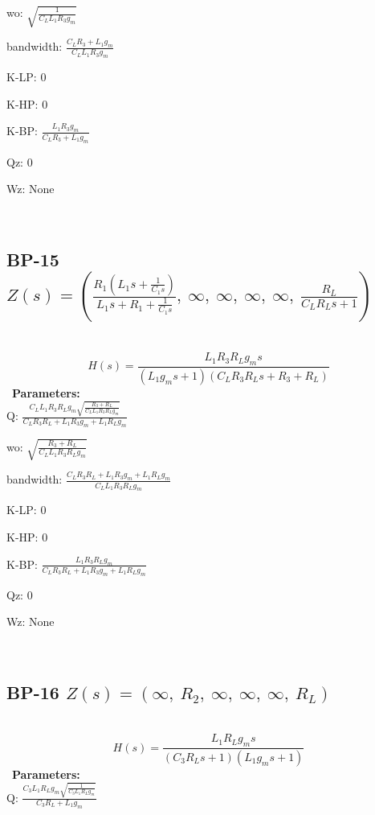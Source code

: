 \documentclass{article}
\begin{document}
wo: $\sqrt{\frac{1}{C_{L} L_{1} R_{3} g_{m}}}$\ 

bandwidth: $\frac{C_{L} R_{3} + L_{1} g_{m}}{C_{L} L_{1} R_{3} g_{m}}$\ 

K-LP: $0$\ 

K-HP: $0$\ 

K-BP: $\frac{L_{1} R_{3} g_{m}}{C_{L} R_{3} + L_{1} g_{m}}$\ 

Qz: $0$\ 

Wz: $\text{None}$\ 

\ 

\subsection{BP-15 $Z(s) = \left( \frac{R_{1} \left(L_{1} s + \frac{1}{C_{1} s}\right)}{L_{1} s + R_{1} + \frac{1}{C_{1} s}}, \  \infty, \  \infty, \  \infty, \  \infty, \  \frac{R_{L}}{C_{L} R_{L} s + 1}\right)$ } \ 
\textbf{\[H(s) = \frac{L_{1} R_{3} R_{L} g_{m} s}{\left(L_{1} g_{m} s + 1\right) \left(C_{L} R_{3} R_{L} s + R_{3} + R_{L}\right)}\] } \ 
\textbf{Parameters:}\\ 

Q: $\frac{C_{L} L_{1} R_{3} R_{L} g_{m} \sqrt{\frac{R_{3} + R_{L}}{C_{L} L_{1} R_{3} R_{L} g_{m}}}}{C_{L} R_{3} R_{L} + L_{1} R_{3} g_{m} + L_{1} R_{L} g_{m}}$\ 

wo: $\sqrt{\frac{R_{3} + R_{L}}{C_{L} L_{1} R_{3} R_{L} g_{m}}}$\ 

bandwidth: $\frac{C_{L} R_{3} R_{L} + L_{1} R_{3} g_{m} + L_{1} R_{L} g_{m}}{C_{L} L_{1} R_{3} R_{L} g_{m}}$\ 

K-LP: $0$\ 

K-HP: $0$\ 

K-BP: $\frac{L_{1} R_{3} R_{L} g_{m}}{C_{L} R_{3} R_{L} + L_{1} R_{3} g_{m} + L_{1} R_{L} g_{m}}$\ 

Qz: $0$\ 

Wz: $\text{None}$\ 

\ 

\subsection{BP-16 $Z(s) = \left( \infty, \  R_{2}, \  \infty, \  \infty, \  \infty, \  R_{L}\right)$ } \ 
\textbf{\[H(s) = \frac{L_{1} R_{L} g_{m} s}{\left(C_{3} R_{L} s + 1\right) \left(L_{1} g_{m} s + 1\right)}\] } \ 
\textbf{Parameters:}\\ 

Q: $\frac{C_{3} L_{1} R_{L} g_{m} \sqrt{\frac{1}{C_{3} L_{1} R_{L} g_{m}}}}{C_{3} R_{L} + L_{1} g_{m}}$\ 
\end{document}
